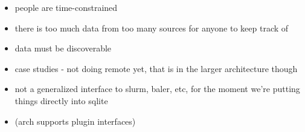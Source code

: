 \begin{itemize}
\item people are time-constrained

\item there is too much data from too many sources for anyone to keep track of

\item data must be discoverable 

\item case studies - not doing remote yet, that is in the larger architecture though

\item not a generalized interface to slurm, baler, etc, for the moment we're putting things directly into sqlite

\item (arch supports plugin interfaces)


\end{itemize}











